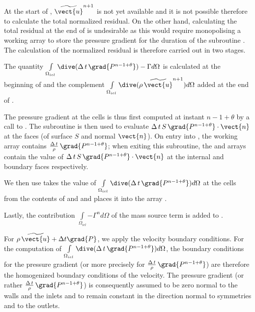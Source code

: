At the start of , $\widetilde{\vect{u}}^{n+1}$ is not yet available and it is not possible therefore to calculate the total normalized residual. On the other hand, calculating the total residual at the end of  is undesirable as this would require monopolising a working array to store the pressure gradient for the duration of the subroutine .
The calculation of the normalized residual is therefore carried out in two stages.

The quantity $\int\limits_{\Omega_{iel}}{\dive(\Delta\,t\,\grad{P^{n-1+\theta}}) -\Gamma d\Omega}$ is calculated at the beginning of  and the complement $\int\limits_{\Omega_{iel}}{\dive(\rho\,\widetilde{\vect{u}}^{n+1})d\Omega}$ added at the end of .

The pressure gradient at the cells is thus first computed at instant $n-1+\theta$ by a call to . The subroutine  is then used to evaluate $\Delta\,t\,S\,\grad{P^{n-1+\theta}}\cdot\vect{n}$ at the faces (of surface $S$ and normal $\vect{n}$). On entry into , the working array  contains $\frac{\Delta\,t}{\rho}\,\grad{P^{n-1+\theta}}$; when exiting this subroutine, the  and  arrays contain the value of $\Delta\,t\,S\,\grad{P^{n-1+\theta}}\cdot\vect{n}$ at the internal and boundary faces respectively.

We then use  takes the value of $\int\limits_{\Omega_{iel}}{\dive(\Delta\,t\,\grad{P^{n-1+\theta}}) d\Omega}$ at the cells from the contents of  and  and places it into the array .

Lastly, the contribution $\int\limits_{\Omega_{iel}}{ -\Gamma^{n} d\Omega}$ of the mass source term is added to .

For $\rho\,\widetilde{\vect{u}} + \Delta t \grad{P}$, we apply the velocity boundary conditions. For the computation of
$\int\limits_{\Omega_{iel}}{\dive(\Delta\,t\,\grad{P^{n-1+\theta}}) d\Omega}$, the boundary conditions for the pressure gradient (or more precisely for $\frac{\Delta\,t}{\rho}\,\grad{P^{n-1+\theta}}$) are therefore the homogenized boundary conditions of the velocity. The pressure gradient (or rather $\frac{\Delta\,t}{\rho}\,\grad{P^{n-1+\theta}}$) is consequently assumed to be zero normal to the walls and the inlets and to remain constant in the direction normal to symmetries and to the outlets.

